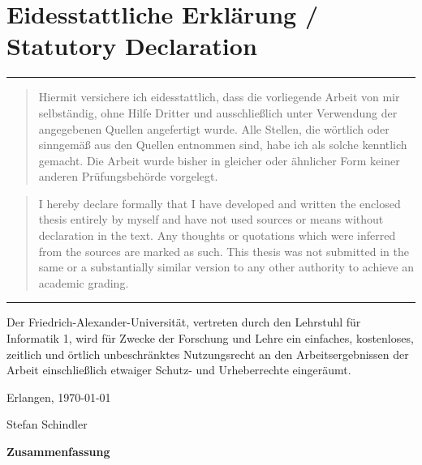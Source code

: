 \documentclass[10pt, a4paper, twoside, headsepline]{scrbook}
\renewcommand{\_}{\origunderscore\allowbreak}
\begin{document}
\pagestyle{plain}
\vspace*{\fill}
\section*{Eidesstattliche Erklärung / Statutory Declaration}

\vspace{0.1cm}
\noindent\hrule
\begin{quote}
Hiermit versichere ich eidesstattlich, dass die vorliegende Arbeit von mir
selbständig, ohne Hilfe Dritter und ausschließlich unter Verwendung der
angegebenen Quellen angefertigt wurde. Alle Stellen, die wörtlich oder
sinngemäß aus den Quellen entnommen sind, habe ich als solche kennt\-lich
gemacht. Die Arbeit wurde bisher in gleicher oder ähnlicher Form keiner anderen
Prüfungsbehörde vorgelegt.
\end{quote}

\begin{quote}
I hereby declare formally that I have developed and written the enclosed thesis
entirely by myself and have not used sources or means without declaration in
the text. Any thoughts or quotations which were inferred from the sources are
marked as such. This thesis was not submitted in the same or a substantially
similar version to any other authority to achieve an academic grading.
\end{quote}
\noindent\hrule

\vspace{0.5cm}
\noindent
Der Friedrich-Alexander-Universität, vertreten durch den Lehrstuhl
für Informatik 1, wird für Zwecke der Forschung und Lehre ein
einfaches, kostenloses, zeitlich und örtlich unbeschränktes
Nutzungsrecht an den Arbeitsergebnissen der Arbeit einschließlich
etwaiger Schutz- und Urheberrechte eingeräumt.

\vspace{0.5cm}
\noindent
Erlangen, \today

\vspace{1cm}
\begin{flushright}
Stefan Schindler \quad\null
\end{flushright}
\cleardoublepage

\vspace*{\fill}
\begin{center}
{\large\textbf{Zusammenfassung}}
\end{center}
\end{document}
